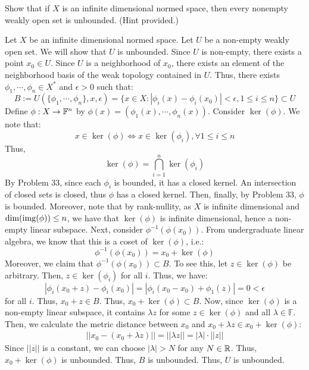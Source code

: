 \documentclass[12pt]{article}
\begin{document}
\begin{problem}{46}
    Show that if $X$ is an infinite dimensional normed space, then every nonempty weakly open set is unbounded. (Hint provided.)
\end{problem}
\begin{solution}
    Let $X$ be an infinite dimensional normed space. Let $U$ be a non-empty weakly open set. We will show that $U$ is unbounded. \bbni
    Since $U$ is non-empty, there exists a point $x_0 \in U$. Since $U$ is a neighborhood of $x_0$, there exists an element of the neighborhood basis of the weak topology contained in $U$. Thus, there exists $\phi_1, \cdots, \phi_n \in X^*$ and $\epsilon > 0$ such that:
    \[ B := U(\{\phi_1, \cdots, \phi_n\}, x, \epsilon) = \{x \in X: |\phi_i(x)-\phi_i(x_0)| < \epsilon, 1 \leq i \leq n\} \subset U \]    
    Define $\phi: X \to \mathbb F^n$ by $\phi(x) = (\phi_1(x), \cdots, \phi_n(x))$. Consider $\ker(\phi)$. We note that: 
    \[  x \in \ker(\phi) \iff x \in \ker(\phi_i), \forall 1 \leq i \leq n\]
    Thus, 
    \[ \ker(\phi) = \bigcap_{i=1}^n \ker(\phi_i)\]
    By Problem 33, since each $\phi_i$ is bounded, it has a closed kernel. An intersection of closed sets is closed, thus $\phi$ has a closed kernel. Then, finally, by Problem 33, $\phi$ is bounded. \bbni
    Moreover, note that by rank-nullity, as $X$ is infinite dimensional and $\dim(\operatorname{img}(\phi)) \leq n$, we have that $\ker(\phi)$ is infinite dimensional, hence a non-empty linear subspace. \bbni
    Next, consider $\phi^{-1}(\phi(x_0))$. From undergraduate linear algebra, we know that this is a coset of $\ker(\phi)$, i.e.:
    \[ \phi^{-1}(\phi(x_0)) = x_0 + \ker(\phi)\]
    Moreover, we claim that $\phi^{-1}(\phi(x_0)) \subset B$. To see this, let $z \in \ker(\phi)$ be arbitrary. Then, $z \in \ker(\phi_i)$ for all $i$. Thus, we have: 
    \[ |\phi_i(x_0+z)-\phi_i(x_0)| = |\phi_i(x_0-x_0)+\phi_1(z)| = 0 < \epsilon \]
    for all $i$. Thus, $x_0 + z \in B$. Thus, $x_0 + \ker(\phi) \subset B$. \bbni
    Now, since $\ker(\phi)$ is a non-empty linear subspace, it contains $\lambda z$ for some $z \in \ker(\phi)$ and all $\lambda \in \mathbb F$. Then, we calculate the metric distance between $x_0$ and $x_0 + \lambda z \in x_0+\ker(\phi)$:
    \begin{align*}
        ||x_0 - (x_0 + \lambda z)|| = ||\lambda z|| = |\lambda| \cdot ||z||
    \end{align*}
    Since $||z||$ is a constant, we can choose $|\lambda| > N$ for any $N \in \mathbb R$. Thus, $x_0 + \ker(\phi)$ is unbounded. Thus, $B$ is unbounded. Thus, $U$ is unbounded. \bbni
\end{solution}
\newpage
\end{document}
